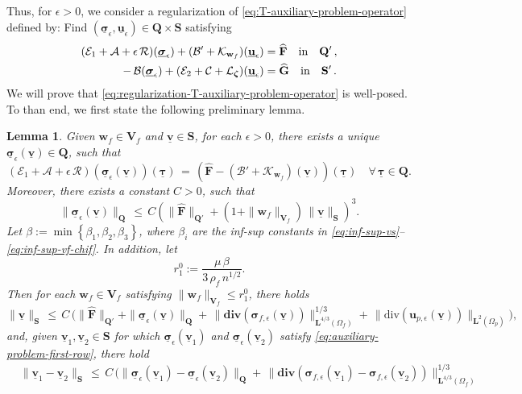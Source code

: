 \documentclass[11pt]{article}
\numberwithin{equation}{section}
\newcommand{\bsi}{{\boldsymbol\sigma}}
\newcommand{\btau}{{\boldsymbol\tau}}
\newcommand{\bzeta}{{\boldsymbol\zeta}}
\newcommand{\ubsi}{\underline{\bsi}}
\newcommand{\ubtau}{\underline{\btau}}
\newcommand{\ubu}{\underline{\bu}}
\newcommand{\ubv}{\underline{\bv}}
\newcommand{\bv}{{\mathbf{v}}}
\newcommand{\bw}{{\mathbf{w}}}
\newcommand{\bu}{\mathbf{u}}
\newcommand{\0}{{\mathbf{0}}}
\def\bF{\mathbf{F}}
\def\bG{\mathbf{G}}
\def\bV{\mathbf{V}}
\def\bQ{\mathbf{Q}}
\def\bS{\mathbf{S}}
\newcommand{\bL}{\mathbf{L}}
\newcommand{\cA}{\mathcal{A}}
\newcommand{\cB}{\mathcal{B}}
\newcommand{\cC}{\mathcal{C}}
\newcommand{\cE}{\mathcal{E}}
\newcommand{\cK}{\mathcal{K}}
\newcommand{\cL}{\mathcal{L}}
\newcommand{\cR}{\mathcal{R}}
\def\bdiv{\mathbf{div}}
\def\div{\mathrm{div}}
\def\qin{{\quad\hbox{in}\quad}}
\def\wh{\widehat}
\newtheorem{lem}[thm]{Lemma}
\numberwithin{equation}{section}
\begin{document}
Thus, for $\epsilon > 0$, we consider a regularization of \eqref{eq:T-auxiliary-problem-operator}  defined by: Find $(\ubsi_\epsilon,\ubu_\epsilon)\in \bQ\times \bS$ satisfying
%
\begin{align}
(\cE_1 + \cA + \epsilon\,\cR)(\ubsi_\epsilon) + (\cB' + \cK_{\bw_f})(\ubu_\epsilon) &= \wh{\bF} \qin \bQ'\,, \nonumber\\ 
-\,\cB(\ubsi_\epsilon) + (\cE_2 + \cC+\cL_{\bzeta})(\ubu_\epsilon) &= \wh{\bG} \qin \bS'\,.\label{eq:regularization-T-auxiliary-problem-operator}
\end{align}
We will prove that \eqref{eq:regularization-T-auxiliary-problem-operator} is well-posed.
To than end, we first state the following preliminary lemma.
%
\begin{lem}\label{lem:auxiliary-problem-first-fow}
Given $\bw_f\in \bV_f$ and $\ubv\in \bS$, for each $\epsilon>0$, there exists a unique $\ubsi_\epsilon(\ubv)\in \bQ$, such that
\begin{equation}\label{eq:auxiliary-problem-first-row}
(\cE_1 + \cA + \epsilon\,\cR)(\ubsi_\epsilon(\ubv))(\ubtau) \,=\, \left(\wh{\bF} - (\cB' + \cK_{\bw_f})(\ubv)\right)(\ubtau) \quad \forall\,\ubtau\in \bQ.
\end{equation}
Moreover, there exists a constant $C>0$, such that
\begin{equation}\label{eq:auxiliary-bound-1}
\|\ubsi_\epsilon(\ubv)\|_\bQ \,\leq\, C \left(\|\wh{\bF}\|_{\bQ'} + (1 + \|\bw_f\|_{\bV_f})\,\|\ubv\|_\bS\right)^3.
\end{equation}
Let $\beta:= \min\left\{ \beta_1, \beta_2, \beta_3\right\}$, where $\beta_i$ are the inf-sup constants in \eqref{eq:inf-sup-vs}--\eqref{eq:inf-sup-vf-chif}. In addition, let
\begin{equation}\label{eq:r_1^0 defn}
r_1^0:= \frac{\mu\,\beta}{3\,\rho_f\,n^{1/2}}.
\end{equation}
Then for each $\bw_f\in \bV_f$ satisfying $\|\bw_f\|_{\bV_f} \leq r_1^0$, there holds
\begin{equation}\label{eq:auxiliary-bound-2}
\|\ubv\|_\bS \,\leq\, C\,\Big( \|\wh{\bF}\|_{\bQ'} + \|\ubsi_\epsilon(\ubv)\|_\bQ + \,\|\bdiv(\bsi_{f,\epsilon}(\ubv))\|^{1/3}_{\bL^{4/3}(\Omega_f)}+\, \|\div(\bu_{p,\epsilon}(\ubv))\|_{\bL^2(\Omega_p)}\Big),
\end{equation}
and, given $\ubv_1, \ubv_2\in \bS$ for which $\ubsi_\epsilon(\ubv_1)$ and $\ubsi_\epsilon(\ubv_2)$ satisfy \eqref{eq:auxiliary-problem-first-row}, there hold
\begin{align}
&\|\ubv_1 - \ubv_2\|_\bS \,\leq\, C\,\Big( \|\ubsi_\epsilon(\ubv_1) - \ubsi_\epsilon(\ubv_2)\|_\bQ + \,\|\bdiv(\bsi_{f,\epsilon}(\ubv_1) - \bsi_{f,\epsilon}(\ubv_2))\|^{1/3}_{\bL^{4/3}(\Omega_f)} \nonumber\\

\end{align}
\end{lem}
\end{document}
